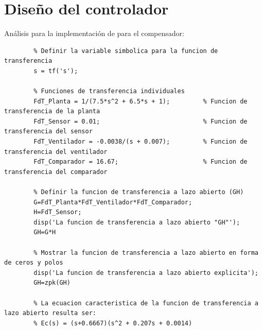 \documentclass[12pt]{article}
\begin{document}
\section{Diseño del controlador}
	Análisis para la implementación de para el compensador:
	\begin{lstlisting}
		% Definir la variable simbolica para la funcion de transferencia
		s = tf('s');  
		
		% Funciones de transferencia individuales
		FdT_Planta = 1/(7.5*s^2 + 6.5*s + 1);         % Funcion de transferencia de la planta
		FdT_Sensor = 0.01;                            % Funcion de transferencia del sensor
		FdT_Ventilador = -0.0038/(s + 0.007);         % Funcion de transferencia del ventilador
		FdT_Comparador = 16.67;                       % Funcion de transferencia del comparador
		
		% Definir la funcion de transferencia a lazo abierto (GH)
		G=FdT_Planta*FdT_Ventilador*FdT_Comparador;
		H=FdT_Sensor;
		disp('La funcion de transferencia a lazo abierto "GH"');
		GH=G*H
		
		% Mostrar la funcion de transferencia a lazo abierto en forma de ceros y polos
		disp('La funcion de transferencia a lazo abierto explicita');
		GH=zpk(GH)  
		
		% La ecuacion caracteristica de la funcion de transferencia a lazo abierto resulta ser:
		% Ec(s) = (s+0.6667)(s^2 + 0.207s + 0.0014)
	\end{lstlisting}\newpage
	
\end{document}
